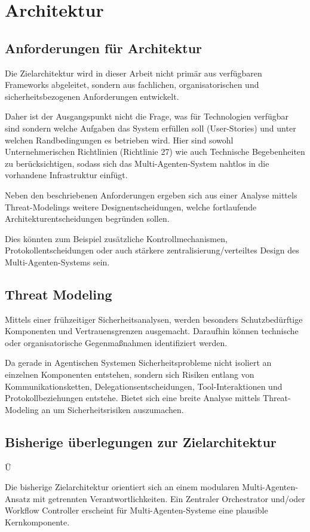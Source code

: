 %

\section{Architektur}

\subsection{Anforderungen für Architektur}

Die Zielarchitektur wird in dieser Arbeit nicht primär aus verfügbaren Frameworks abgeleitet, sondern aus fachlichen, organisatorischen und sicherheitsbezogenen Anforderungen entwickelt.

Daher ist der Ausgangspunkt nicht die Frage, was für Technologien verfügbar sind sondern welche Aufgaben das System erfüllen soll (User-Stories) und unter welchen Randbedingungen es betrieben wird. Hier sind sowohl Unternehmerischen Richtlinien (Richtlinie 27) wie auch Technische Begebenheiten zu berücksichtigen, sodass sich das Multi-Agenten-System nahtlos in die vorhandene Infrastruktur einfügt.

Neben den beschriebenen Anforderungen ergeben sich aus einer Analyse mittels Threat-Modelings weitere Designentscheidungen, welche fortlaufende Architekturentscheidungen begründen sollen.

Dies könnten zum Beispiel zusätzliche Kontrollmechanismen, Protokollentscheidungen oder auch stärkere zentralisierung/verteiltes Design des Multi-Agenten-Systems sein.

\subsection{Threat Modeling}

Mittels einer frühzeitiger Sicherheitsanalysen, werden besonders Schutzbedürftige Komponenten und Vertrauensgrenzen ausgemacht. \cite{shostack2014threat} Daraufhin können technische oder organisatorische Gegenmaßnahmen identifiziert werden.

Da gerade in Agentischen Systemen Sicherheitsprobleme nicht isoliert an einzelnen Komponenten entstehen, sondern sich Risiken entlang von Kommunikationsketten, Delegationsentscheidungen, Tool-Interaktionen und Protokollbeziehungen entstehe. \cite{wong_adding_2000} Bietet sich eine breite Analyse mittels Threat-Modeling an um Sicherheitsrisiken auszumachen. \cite{owasp_owasp_nodate}

\subsection{Bisherige überlegungen zur Zielarchitektur}Ü

Die bisherige Zielarchitektur orientiert sich an einem modularen Multi-Agenten-Ansatz mit getrennten Verantwortlichkeiten. Ein Zentraler Orchestrator und/oder Workflow Controller erscheint für Multi-Agenten-Systeme eine plausible Kernkomponente. \cite{georgeff_communication_1983,jennings_roadmap_1998, vashishtha_cosmic_2026} 

